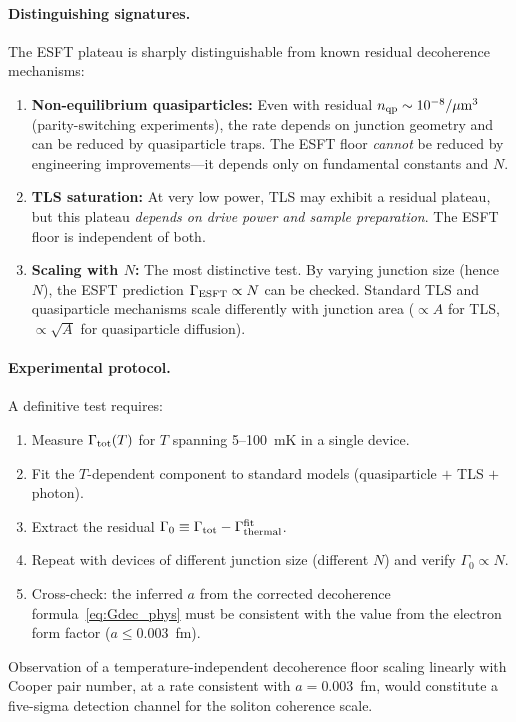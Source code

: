 ﻿\documentclass[a4paper,12pt]{article}
\begin{document}
\paragraph{Distinguishing signatures.}
The ESFT plateau is sharply distinguishable from known residual
decoherence mechanisms:
\begin{enumerate}
  \item \textbf{Non-equilibrium quasiparticles:} Even with
    residual $n_{\rm qp}\sim 10^{-8}/\mu\text{m}^3$
    (parity-switching experiments), the rate depends on
    junction geometry and can be reduced by quasiparticle
    traps.  The ESFT floor \emph{cannot} be reduced by
    engineering improvements---it depends only on
    fundamental constants and $N$.
  \item \textbf{TLS saturation:} At very low power, TLS
    may exhibit a residual plateau, but this plateau
    \emph{depends on drive power and sample preparation}.
    The ESFT floor is independent of both.
  \item \textbf{Scaling with $N$:} The most distinctive test.
    By varying junction size (hence $N$), the ESFT prediction
    $\Gamma_{\rm ESFT}\propto N$ can be checked.  Standard
    TLS and quasiparticle mechanisms scale differently with
    junction area ($\propto A$ for TLS, $\propto \sqrt{A}$
    for quasiparticle diffusion).
\end{enumerate}

\paragraph{Experimental protocol.}
A definitive test requires:
\begin{enumerate}
  \item Measure $\Gamma_{\rm tot}(T)$ for $T$ spanning
    5--100~mK in a single device.
  \item Fit the $T$-dependent component to standard models
    (quasiparticle $+$ TLS $+$ photon).
  \item Extract the residual $\Gamma_0 \equiv
    \Gamma_{\rm tot} - \Gamma_{\rm thermal}^{\rm fit}$.
  \item Repeat with devices of different junction size
    (different $N$) and verify $\Gamma_0\propto N$.
  \item Cross-check: the inferred $a$ from the corrected
    decoherence formula~\eqref{eq:Gdec_phys} must be consistent
    with the value from the electron form factor
    ($a\leq 0.003$~fm).
\end{enumerate}
Observation of a temperature-independent decoherence floor
scaling linearly with Cooper pair number, at a rate consistent
with $a=0.003$~fm, would constitute a five-sigma detection
channel for the soliton coherence scale.
\end{document}
